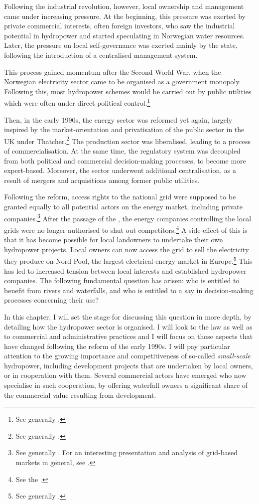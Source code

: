 Following the industrial revolution, however, local ownership and management came under increasing pressure. At the beginning, this pressure was exerted by private commercial interests, often foreign investors, who saw the industrial potential in hydropower and started speculating in Norwegian water resources. Later, the pressure on local self-governance was exerted mainly by the state, following the introduction of a centralised management system.

This process gained momentum after the Second World War, when the Norwegian electricity sector came to be organised as a government monopoly. Following this, most hydropower schemes would be carried out by public utilities which were often under direct political control.\footnote{See generally \cite{skjold06}.}

Then, in the early 1990s, the energy sector was reformed yet again, largely inspired by the market-orientation and privatisation of the public sector in the UK under Thatcher.\footnote{See generally \cite{midttun98}.} The production sector was liberalised, leading to a process of commercialisation. At the same time, the regulatory system was decoupled from both political and commercial decision-making processes, to become more expert-based. Moreover, the sector underwent additional centralisation, as a result of mergers and acquisitions among former public utilities.

Following the reform, access rights to the national grid were supposed to be granted equally to all potential actors on the energy market, including private companies.\footnote{See generally \cite{hammer96}. For an interesting presentation and analysis of grid-based markets in general, see \cite{falch04}.} After the passage of the \cite{ea90}, the energy companies controlling the local grids were no longer authorised to shut out competitors.\footnote{See the \cite[3-4]{ea90}.} A side-effect of this is that it has become possible for local landowners to undertake their own hydropower projects. Local owners can now access the grid to sell the electricity they produce on Nord Pool, the largest electrical energy market in Europe.\footnote{See generally \cite{larsen06,larsen08,larsen12}.} This has led to increased tension between local interests and established hydropower companies. The following fundamental question has arisen: who is entitled to benefit from rivers and waterfalls, and who is entitled to a say in decision-making processes concerning their use?

In this chapter, I will set the stage for discussing this question in more depth, by detailing how the hydropower sector is organised. I will look to the law as well as to commercial and administrative practices and I will focus on those aspects that have changed following the reform of the early 1990s. I will pay particular attention to the growing importance and competitiveness of so-called {\it small-scale} hydropower, including development projects that are undertaken by local owners, or in cooperation with them. Several commercial actors have emerged who now specialise in such cooperation, by offering waterfall owners a significant share of the commercial value resulting from development. 

